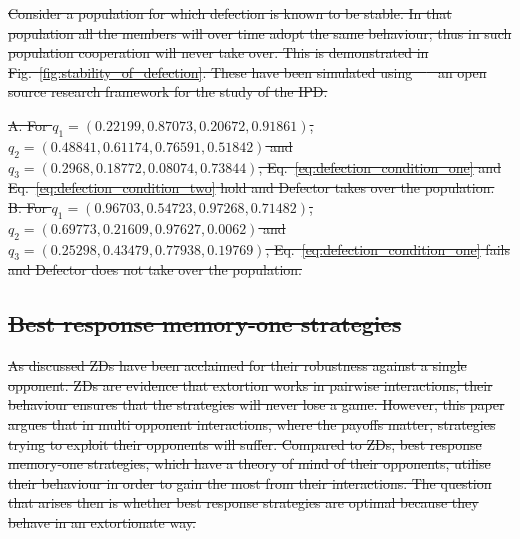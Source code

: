 \documentclass[10pt]{article}
\providecommand{\DIFdeltex}[1]{{\protect\color{red}\sout{#1}}}                      %
\providecommand{\DIFdelFL}[1]{\DIFdel{#1}} %
\providecommand{\DIFdel}[1]{\texorpdfstring{\DIFdeltex{#1}}{}} %
\begin{document}
\DIFdel{Consider a population for which defection is known to be stable. In that
population all the members will over time adopt the same behaviour; thus in such
population cooperation will never take over. This is demonstrated in
Fig.~\ref{fig:stability_of_defection}.
These have been simulated using~\mbox{%
\cite{axelrodproject} }\hspace{0pt}%
an open
source research framework for the study of the IPD.
}%

{%
\DIFdelFL{A. For \(q_{1}=(0.22199, 0.87073, 0.20672, 0.91861)\),
    $q_{2}=(0.48841, 0.61174, 0.76591, 0.51842)$ and
    $q_{3}=(0.2968, 0.18772, 0.08074, 0.73844)$, Eq.~\ref{eq:defection_condition_one} and
    Eq.~\ref{eq:defection_condition_two} hold and Defector takes over the
    population. B. For $q_{1}=(0.96703, 0.54723, 0.97268, 0.71482)$,
    $q_{2}=(0.69773, 0.21609, 0.97627, 0.0062)$ and
    $q_{3}=(0.25298, 0.43479, 0.77938, 0.19769)$, Eq.~\ref{eq:defection_condition_one} fails
    and Defector does not take over the population.}}%

\subsection{\DIFdel{Best response memory-one strategies}}%
\addtocounter{subsection}{-1}%

\DIFdel{As discussed ZDs have been acclaimed for their robustness
against a single opponent. ZDs are evidence that extortion works
in pairwise interactions, their behaviour ensures that the strategies will never
lose a game. However, this paper argues that in multi opponent interactions,
where the payoffs matter, strategies trying to exploit their opponents will
suffer.
Compared to ZDs, best response memory-one strategies, which have a
theory of mind of their opponents, utilise their behaviour in order to gain the
most from their interactions. The question that arises then is whether best
response strategies are optimal because they behave in an extortionate way.
}%
\end{document}

